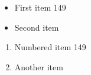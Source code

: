 \documentclass{article}
\begin{document}
\begin{itemize}
\item First item 149
\item Second item
\end{itemize}
\begin{enumerate}
\item Numbered item 149
\item Another item
\end{enumerate}
\end{document}
